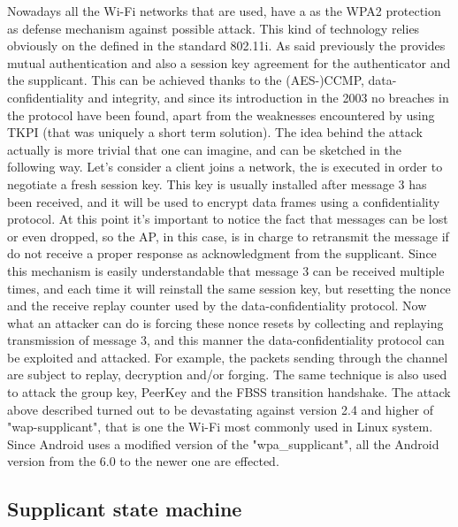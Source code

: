 Nowadays all the Wi-Fi networks that are used, have a as the WPA2 protection as defense mechanism against possible attack. This kind of technology relies obviously on the \fwh defined in the standard 802.11i.
As said previously the \fwh provides mutual authentication and also a session key agreement for the authenticator and the supplicant. This can be achieved thanks to the (AES-)CCMP, data-confidentiality and integrity, and since its introduction 
in the 2003 no breaches in the protocol have been found, apart from the weaknesses encountered by using TKPI (that was uniquely a short term solution).
The idea behind the attack actually is more trivial that one can imagine, and can be sketched in the following way. Let's consider a client joins a network, the \fwh is executed in order to negotiate a fresh session key. This key is usually installed after message 3 has been received, and it will be used
to encrypt data frames using a confidentiality protocol. At this point it's important to notice the fact that messages can be lost or even dropped, so the AP, in this case, is in charge to retransmit the message if do not receive a proper response as acknowledgment from the supplicant. Since this mechanism is easily 
understandable that message 3 can be received multiple times, and each time it will reinstall the same session key, but resetting the nonce and the receive replay counter used by the data-confidentiality protocol.
Now what an attacker can do is forcing these nonce resets by collecting and replaying transmission of message 3, and this manner the data-confidentiality protocol can be exploited and attacked. For example, the packets sending through the channel are subject to replay, decryption and/or forging.
The same technique is also used to attack the group key, PeerKey and the FBSS transition handshake.
The attack above described turned out to be devastating against version 2.4 and higher of "wap-supplicant", that is one the Wi-Fi most commonly used in Linux system. Since Android uses a modified version of the "wpa\_supplicant", all the Android version from the 6.0 to the newer one are effected.

\subsection{Supplicant state machine}

